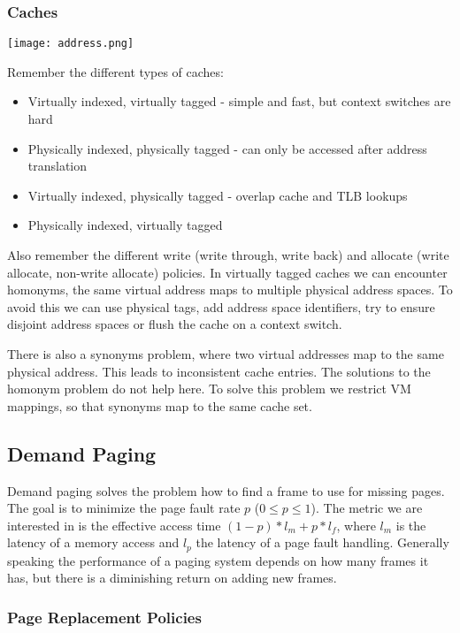 \subsubsection{Caches}

\begin{center}
	\texttt{[image: address.png]}
\end{center}

Remember the different types of caches:
\begin{itemize}
	\item Virtually indexed, virtually tagged - simple and fast, but context switches are hard
	\item Physically indexed, physically tagged - can only be accessed after address translation
	\item Virtually indexed, physically tagged - overlap cache and TLB lookups
	\item Physically indexed, virtually tagged
\end{itemize}

Also remember the different write (write through, write back) and allocate (write allocate, non-write allocate) policies. In virtually tagged caches we can encounter homonyms, the same virtual address maps to multiple physical address spaces. To avoid this we can use physical tags, add address space identifiers, try to ensure disjoint address spaces or flush the cache on a context switch. \medskip

There is also a synonyms problem, where two virtual addresses map to the same physical address. This leads to inconsistent cache entries. The solutions to the homonym problem do not help here. To solve this problem we restrict VM mappings, so that synonyms map to the same cache set. 


\subsection{Demand Paging}

Demand paging solves the problem how to find a frame to use for missing pages. The goal is to minimize the page fault rate $p$ ($0 \leq p \leq 1$). The metric we are interested in is the effective access time $(1-p) * l_m + p * l_f$, where $l_m$ is the latency of a memory access and $l_p$ the latency of a page fault handling. Generally speaking the performance of a paging system depends on how many frames it has, but there is a diminishing return on adding new frames.

\subsubsection{Page Replacement Policies}

